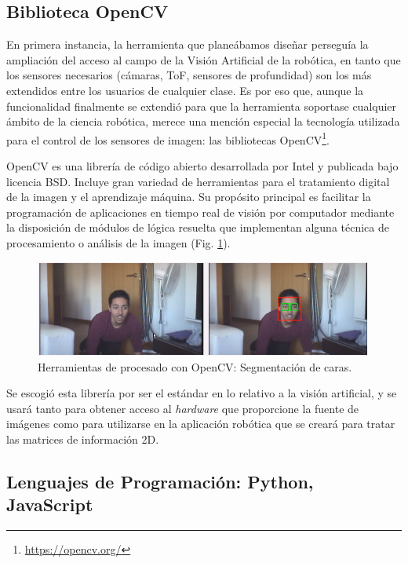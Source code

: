 \subsection{Biblioteca OpenCV}
En primera instancia, la herramienta que planeábamos diseñar perseguía la ampliación del acceso al campo de la Visión Artificial de la robótica, en tanto que los sensores necesarios (cámaras, ToF, sensores de profundidad) son los más extendidos entre los usuarios de cualquier clase. Es por eso que, aunque la funcionalidad finalmente se extendió para que la herramienta soportase cualquier ámbito de la ciencia robótica, merece una mención especial la tecnología utilizada para el control de los sensores de imagen: las bibliotecas OpenCV\footnote{\url{https://opencv.org/}}.

OpenCV es una librería de código abierto desarrollada por Intel y publicada bajo licencia BSD. Incluye gran variedad de herramientas para el tratamiento digital de la imagen y el aprendizaje máquina. Su propósito principal es facilitar la programación de aplicaciones en tiempo real de visión por computador mediante la disposición de módulos de lógica resuelta que implementan alguna técnica de procesamiento o análisis de la imagen (Fig. \ref{opencv}).

\begin{figure}[!hbtp]  \centering\noindent
    \includegraphics[width=0.99\textwidth]{figures/opencv-face.png}
    \caption{Herramientas de procesado con OpenCV: Segmentación de caras.}
    \label{opencv}
\end{figure}

Se escogió esta librería por ser el estándar en lo relativo a la visión artificial, y se usará tanto para obtener acceso al \textit{hardware} que proporcione la fuente de imágenes como para utilizarse en la aplicación robótica que se creará para tratar las matrices de información 2D.

\subsection{Lenguajes de Programación: Python, JavaScript}

